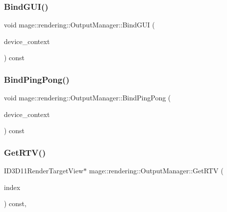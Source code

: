 \subsubsection{\texorpdfstring{Bind\+G\+U\+I()}{BindGUI()}}
{\footnotesize\ttfamily void mage\+::rendering\+::\+Output\+Manager\+::\+Bind\+G\+UI (\begin{DoxyParamCaption}\item[{I\+D3\+D11\+Device\+Context \&}]{device\+\_\+context }\end{DoxyParamCaption}) const\hspace{0.3cm}{\ttfamily [noexcept]}}

\mbox{\label{classmage_1_1rendering_1_1_output_manager_aacb8da12f24fe9b7f1c3aac6f52ba9a1}} 
\subsubsection{\texorpdfstring{Bind\+Ping\+Pong()}{BindPingPong()}}
{\footnotesize\ttfamily void mage\+::rendering\+::\+Output\+Manager\+::\+Bind\+Ping\+Pong (\begin{DoxyParamCaption}\item[{I\+D3\+D11\+Device\+Context \&}]{device\+\_\+context }\end{DoxyParamCaption}) const\hspace{0.3cm}{\ttfamily [noexcept]}}

\mbox{\label{classmage_1_1rendering_1_1_output_manager_a2088241f582fd9b119f485c5e9a13b30}} 
\subsubsection{\texorpdfstring{Get\+R\+T\+V()}{GetRTV()}}
{\footnotesize\ttfamily I\+D3\+D11\+Render\+Target\+View$\ast$ mage\+::rendering\+::\+Output\+Manager\+::\+Get\+R\+TV (\begin{DoxyParamCaption}\item[{\mbox{\hyperlink{classmage_1_1rendering_1_1_output_manager_af9caebb7e9cacf454d26b827a01e857c}{R\+T\+V\+Index}}}]{index }\end{DoxyParamCaption}) const\hspace{0.3cm}{\ttfamily [private]}, {\ttfamily [noexcept]}}

